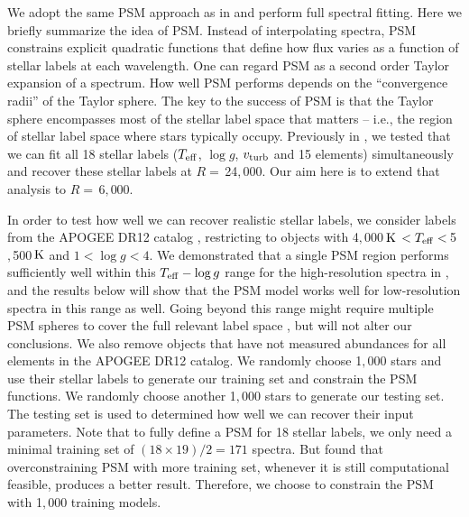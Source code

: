 \documentclass[iop]{emulateapj}
\begin{document}
\begin{CJK*}{UTF8}{gbsn}
We adopt the same PSM approach as in \citet{rix16} and perform full spectral fitting. Here we briefly summarize the idea of PSM. Instead of interpolating spectra, PSM constrains explicit quadratic functions that define how flux varies as a function of stellar labels at each wavelength. One can regard PSM as a second order Taylor expansion of a spectrum. How well PSM performs depends on the ``convergence radii'' of the Taylor sphere. The key to the success of PSM \citep[and related data-driven models such as the Cannon, cf.][]{nes15a,cas16} is that the Taylor sphere encompasses most of the stellar label space that matters -- i.e., the region of stellar label space where stars typically occupy. Previously in \citet{rix16}, we tested that we can fit all 18 stellar labels ($T_{\rm eff}$, $\log g$, $v_{\rm turb}$ and 15 elements) simultaneously and recover these stellar labels at $R =\,$24$,$000. Our aim here is to extend that analysis to $R = \,$6$,$000.

In order to test how well we can recover realistic stellar labels, we consider labels from the APOGEE DR12 catalog \citep{hol15}, restricting to objects with 4$,$000$\, {\rm K} \, < T_{\rm eff} < \,$5$,$500$ \, {\rm K}$ and $1 < \log g < 4$. We demonstrated that a single PSM region performs sufficiently well within this $T_{\rm eff}-\log g$ range for the high-resolution spectra in \citet{rix16}, and the results below will show that the PSM model works well for low-resolution spectra in this range as well. Going beyond this range might require multiple PSM spheres to cover the full relevant label space \citep[see][]{tin16}, but will not alter our conclusions. We also remove objects that have not measured abundances for all elements in the APOGEE DR12 catalog. We randomly choose 1$,$000 stars and use their stellar labels to generate our training set and constrain the PSM functions. We randomly choose another 1$,$000 stars to generate our testing set. The testing set is used to determined how well we can recover their input parameters. Note that to fully define a PSM for 18 stellar labels, we only need a minimal training set of $(18 \times 19)/2 = 171$ spectra. But \citet{rix16} found that overconstraining PSM with more training set, whenever it is still computational feasible, produces a better result. Therefore, we choose to constrain the PSM with 1$,$000 training models.


\end{CJK*}
\end{document}
